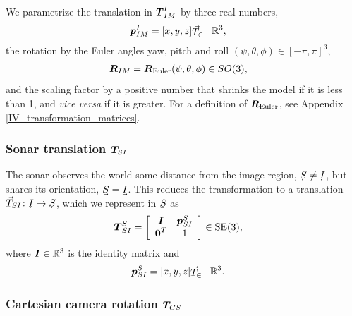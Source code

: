 We parametrize the translation in $\boldsymbol{T}_{IM}^I$ by three real numbers,
%
\begin{align}
\dvec{p}_{IM}^I &= [x,y,z]\T \in \mathbb{R}^3,
\end{align}
%
the rotation by the Euler angles yaw, pitch and roll $(\psi,\theta,\phi) \in [-\pi,\pi]^3$,
%
\begin{align}
\boldsymbol{R}_{IM}    &= \boldsymbol{R}_{\mathrm{Euler}}(\psi,\theta,\phi) \in SO(3),
\end{align}
%
and the scaling factor by a positive number that shrinks the model if it is less than 1, and \emph{vice versa} if it is greater. For a definition of $\boldsymbol{R}_{\mathrm{Euler}}$, see Appendix \ref{IV_transformation_matrices}.


\subsubsection{Sonar translation $\boldsymbol{T}_{\!SI}$}

The sonar observes the world some distance from the image region, $\udot{S}\ne\udot{I}$, but shares its orientation, $\uvec{S}=\uvec{I}$. This reduces the transformation to a translation $\vec{T}_{SI}\colon \udot{I}\to\udot{S}$, which we represent in $\ubar{S}$ as
%
\begin{align}
\dvec{T}_{SI}^S &= 
\left[\begin{array}{c c}
 \mat{I}  & \dvec{p}_{SI}^S \\%
 \dvec{0}^T  &  1
\end{array}\right] \in \mathrm{SE}(3), \label{eq_T_SI}
\end{align}
%
where $\boldsymbol{I}\in\mathbb{R}^3$ is the identity matrix and 
%
\begin{align}
\dvec{p}_{SI}^S &= [x,y,z]\T \in \mathbb{R}^3.
\end{align}
%


\subsubsection{Cartesian camera rotation $\boldsymbol{T}_{\!CS}$}


